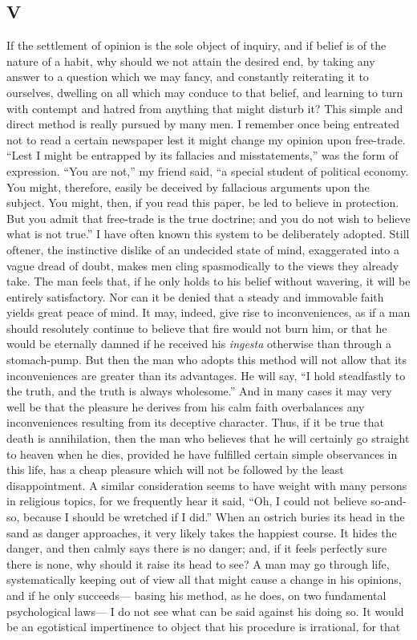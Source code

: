 \documentclass[]{article}
\begin{document}
\subsection*{V}

If the settlement of opinion is the sole object of inquiry, and if belief is of the nature of a habit, why should we not attain the desired end, by taking any answer to a question which we may fancy, and constantly reiterating it to ourselves, dwelling on all which may conduce to that belief, and learning to turn with contempt and hatred from anything that might disturb it? This simple and direct method is really pursued by many men. I remember once being entreated not to read a certain newspaper lest it might change my opinion upon free-trade. ``Lest I might be entrapped by its fallacies and misstatements,'' was the form of expression. ``You are not,'' my friend said, ``a special student of political economy. You might, therefore, easily be deceived by fallacious arguments upon the subject. You might, then, if you read this paper, be led to believe in protection. But you admit that free-trade is the true doctrine; and you do not wish to believe what is not true.'' I have often known this system to be deliberately adopted. Still oftener, the instinctive dislike of an undecided state of mind, exaggerated into a vague dread of doubt, makes men cling spasmodically to the views they already take. The man feels that, if he only holds to his belief without wavering, it will be entirely satisfactory. Nor can it be denied that a steady and immovable faith yields great peace of mind. It may, indeed, give rise to inconveniences, as if a man should resolutely continue to believe that fire would not burn him, or that he would be eternally damned if he received his \emph{ingesta} otherwise than through a stomach-pump. But then the man who adopts this method will not allow that its inconveniences are greater than its advantages. He will say, ``I hold steadfastly to the truth, and the truth is always wholesome.'' And in many cases it may very well be that the pleasure he derives from his calm faith overbalances any inconveniences resulting from its deceptive character. Thus, if it be true that death is annihilation, then the man who believes that he will certainly go straight to heaven when he dies, provided he have fulfilled certain simple observances in this life, has a cheap pleasure which will not be followed by the least disappointment. A similar consideration seems to have weight with many persons in religious topics, for we frequently hear it said, ``Oh, I could not believe so-and-so, because I should be wretched if I did.'' When an ostrich buries its head in the sand as danger approaches, it very likely takes the happiest course. It hides the danger, and then calmly says there is no danger; and, if it feels perfectly sure there is none, why should it raise its head to see? A man may go through life, systematically keeping out of view all that might cause a change in his opinions, and if he only succeeds--- basing his method, as he does, on two fundamental psychological laws--- I do not see what can be said against his doing so. It would be an egotistical impertinence to object that his procedure is irrational, for that 
\end{document}
